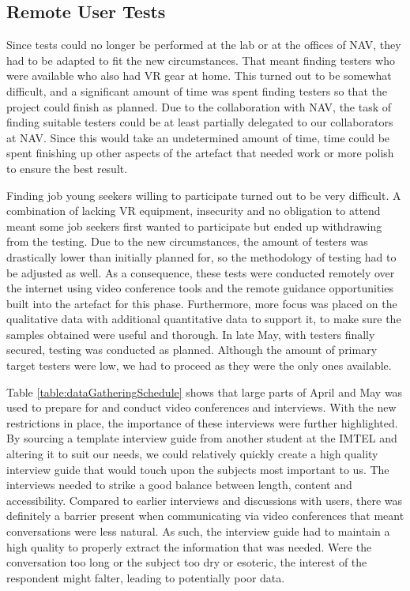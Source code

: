 \subsection{Remote User Tests}
Since tests could no longer be performed at the lab or at the offices of NAV, they had to be adapted to fit the new circumstances. That meant finding testers who were available who also had VR gear at home. This turned out to be somewhat difficult, and a significant amount of time was  spent finding testers so that the project could finish as planned. Due to the collaboration with NAV, the task of finding suitable testers could be at least partially delegated to our collaborators at NAV. Since this would take an undetermined amount of time, time could be spent finishing up other aspects of the artefact that needed work or more polish to ensure the best result.

Finding job young seekers willing to participate turned out to be very difficult. A combination of lacking VR equipment, insecurity and no obligation to attend meant some job seekers first wanted to participate but ended up withdrawing from the testing. Due to the new circumstances, the amount of testers was drastically lower than initially planned for, so the methodology of testing had to be adjusted as well. As a consequence, these tests were conducted remotely over the internet using video conference tools and the remote guidance opportunities built into the artefact for this phase. Furthermore, more focus was placed on the qualitative data with additional quantitative data to support it, to make sure the samples obtained were useful and thorough. In late May, with testers finally secured, testing was conducted as planned. Although the amount of primary target testers were low, we had to proceed as they were the only ones available.   

Table \ref{table:dataGatheringSchedule} shows that large parts of April and May was used to prepare for and conduct video conferences and interviews. With the new restrictions in place, the importance of these interviews were further highlighted. By sourcing a template interview guide from another student at the IMTEL and altering it to suit our needs, we could relatively quickly create a high quality interview guide that would touch upon the subjects most important to us. The interviews needed to strike a good balance between length, content and accessibility. Compared to earlier interviews and discussions with users, there was definitely a barrier present when communicating via video conferences that meant conversations were less natural. As such, the interview guide had to maintain a high quality to properly extract the information that was needed. Were the conversation too long or the subject too dry or esoteric, the interest of the respondent might falter, leading to potentially poor data.

